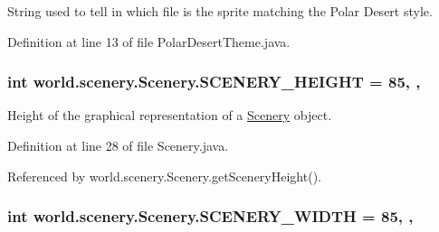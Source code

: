String used to tell in which file is the sprite matching the Polar Desert style. 



Definition at line 13 of file Polar\-Desert\-Theme.\-java.

\hypertarget{classworld_1_1scenery_1_1_scenery_a106e53ae6e1647395740237ccce7f363}{
\subsubsection[{S\-C\-E\-N\-E\-R\-Y\-\_\-\-H\-E\-I\-G\-H\-T}]{\setlength{\rightskip}{0pt plus 5cm}int world.\-scenery.\-Scenery.\-S\-C\-E\-N\-E\-R\-Y\-\_\-\-H\-E\-I\-G\-H\-T = 85\hspace{0.3cm}{\ttfamily [static]}, {\ttfamily [protected]}, {\ttfamily [inherited]}}}\label{classworld_1_1scenery_1_1_scenery_a106e53ae6e1647395740237ccce7f363}


Height of the graphical representation of a \hyperlink{classworld_1_1scenery_1_1_scenery}{Scenery} object. 



Definition at line 28 of file Scenery.\-java.



Referenced by world.\-scenery.\-Scenery.\-get\-Scenery\-Height().

\hypertarget{classworld_1_1scenery_1_1_scenery_affb047c028883c6d069a03ef0f1caeb8}{
\subsubsection[{S\-C\-E\-N\-E\-R\-Y\-\_\-\-W\-I\-D\-T\-H}]{\setlength{\rightskip}{0pt plus 5cm}int world.\-scenery.\-Scenery.\-S\-C\-E\-N\-E\-R\-Y\-\_\-\-W\-I\-D\-T\-H = 85\hspace{0.3cm}{\ttfamily [static]}, {\ttfamily [protected]}, {\ttfamily [inherited]}}}\label{classworld_1_1scenery_1_1_scenery_affb047c028883c6d069a03ef0f1caeb8}


